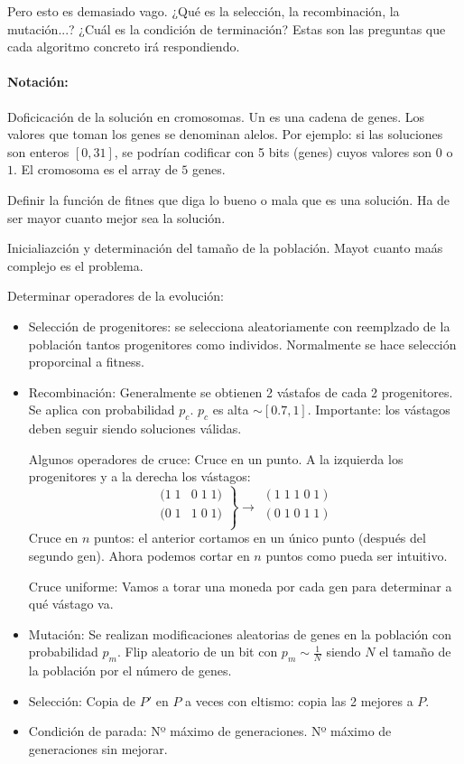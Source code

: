 \documentclass{apuntes}
\begin{document}
Pero esto es demasiado vago. ¿Qué es la selección, la recombinación, la mutación...? ¿Cuál es la condición de terminación? Estas son las preguntas que cada algoritmo concreto irá respondiendo.

\paragraph{Notación:} Doficicación de la solución en cromosomas. Un  es una cadena de genes. Los valores que toman los genes se denominan alelos. Por ejemplo: si las soluciones son enteros $[0,31]$, se podrían codificar con 5 bits (genes) cuyos valores son $0$ o $1$. El cromosoma es el array de $5$ genes.

Definir la función de fitnes que diga lo bueno o mala que es una solución. Ha de ser mayor cuanto mejor sea la solución.

Inicialiazción y determinación del tamaño de la población. Mayot cuanto maás complejo es el problema.

Determinar operadores de la evolución:
\begin{itemize}
	\item Selección de progenitores: se selecciona aleatoriamente con reemplzado de la población tantos progenitores como individos. Normalmente se hace selección proporcinal a fitness.
	\item Recombinación: Generalmente se obtienen 2 vástafos de cada 2 progenitores. Se aplica con probabilidad $p_c$. $p_c$ es alta $\sim [0.7,1]$. Importante: los vástagos deben seguir siendo soluciones válidas.

	Algunos operadores de cruce:
	\subitem Cruce en un punto. A la izquierda los progenitores y a la derecha los vástagos:
	\[
	\left.
	\begin{array}{cc}
	(1 \; 1 & 0 \; 1 \; 1) \\
	(0 \; 1 & 1 \; 0 \; 1) \\
	\end{array}
	\right\} \to \begin{array}{c}
	(1 \; 1 \; 1 \; 0 \; 1) \\
	(0 \; 1 \; 0 \; 1 \; 1) \\
	\end{array}
	\]
	\subitem Cruce en $n$ puntos: el anterior cortamos en un único punto (después del segundo gen). Ahora podemos cortar en $n$ puntos como pueda ser intuitivo.

	\subitem Cruce uniforme: Vamos a torar una moneda por cada gen para determinar a qué vástago va.
	\item Mutación: Se realizan modificaciones aleatorias de genes en la población con probabilidad $p_m$. 
	\subitem Flip aleatorio de un bit con $p_m \sim\frac{1}{N}$ siendo $N$ el tamaño de la población por el número de genes.
	\item Selección: Copia de $P'$ en $P$ a veces con eltismo: copia las 2 mejores a $P$.
	\item Condición de parada:
	\subitem Nº máximo de generaciones.
	\subitem Nº máximo de generaciones sin mejorar.
\end{itemize}
\end{document}
